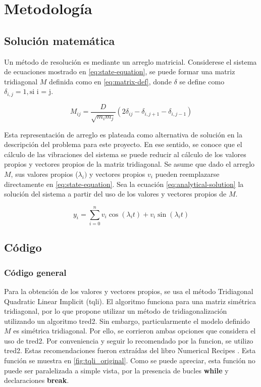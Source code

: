 \section{Metodología}
\subsection{Solución matemática}

Un método de resolución es mediante un arreglo matricial. Considerese el sistema de ecuaciones mostrado en \ref{eq:state-equation}, se puede formar una matriz tridiagonal $M$ definida como en \ref{eq:matrix-def}, donde $\delta$ se define como $\delta_{i,j} = 1, \text{si i = j}$.

\begin{equation}
	M_{ij} = \frac{D}{\sqrt{m_i m_j}} (2 \delta_{ij} - \delta_{i, j+1} - \delta_{i, j-1}) 
	\label{eq:matrix-def}
\end{equation}

Esta representación de arreglo es plateada como alternativa de solución en la descripción del problema para este proyecto. En ese sentido, se conoce que el cálculo de las vibraciones del sistema se puede reducir al cálculo de los valores propios y vectores propios de la matriz tridiagonal. Se asume que dado el arreglo $M$, sus valores propios ($\lambda_i)$ y vectores propios $v_i$ pueden reemplazarse directamente en \ref{eq:state-equation}. Sea la ecuación \ref{eq:analytical-solution} la solución del sistema a partir del uso de los valores y vectores propios de $M$. 

\begin{equation}
	y_{i} = \sum^{n}_{i=0} v_i \cos(\lambda_i t ) + v_i \sin(\lambda_i t )  
	\label{eq:analytical-solution}
\end{equation}

\subsection{Código}
\subsubsection{Código general}

Para la obtención de los valores y vectores propios, se usa el método Tridiagonal Quadratic Linear Implicit (tqli). El algoritmo funciona para una matriz simétrica tridiagonal, por lo que propone utilizar un método de tridiagonalización utilizando un algoritmo tred2. Sin embargo, particularmente el modelo definido $M$ es simétrica tridiagonal. Por ello, se corrieron ambas opciones que considera el uso de tred2. Por conveniencia y seguir lo recomendado por la funcion, se utilizo tred2. Estas recomendaciones fueron extraídas del libro Numerical Recipes \cite{press2007numerical}. Esta función se muestra en \ref{fig:tqli_original}. Como se puede apreciar, esta función no puede ser paralelizada a simple vista, por la presencia de bucles \textbf{while} y declaraciones \textbf{break}. 

